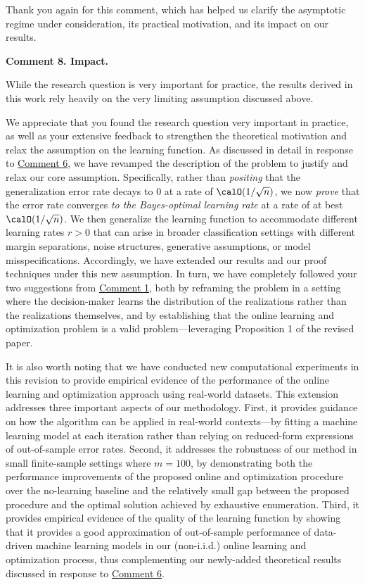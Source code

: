 \documentclass[11pt]{article}
\begin{document}
Thank you again for this comment, which has helped us clarify the asymptotic regime under consideration, its practical motivation, and its impact on our results.

\begin{commentBox}
\textbf{Comment 8. Impact.}\label{R1:8}

    While the research question is very important for practice, the results derived in this work rely heavily on the very limiting assumption discussed above.
\end{commentBox}

We appreciate that you found the research question very important in practice, as well as your extensive feedback to strengthen the theoretical motivation and relax the assumption on the learning function. As discussed in detail in response to \hyperref[R1:6]{\color{blue}Comment 6}, we have revamped the description of the problem to justify and relax our core assumption. Specifically, rather than \textit{positing} that the generalization error rate decays to 0 at a rate of $\calO(1/\sqrt{n})$, we now \textit{prove} that the error rate converges \textit{to the Bayes-optimal learning rate} at a rate of at best $\calO(1/\sqrt{n})$. We then generalize the learning function to accommodate different learning rates $r>0$ that can arise in broader classification settings with different margin separations, noise structures, generative assumptions, or model misspecifications. Accordingly, we have extended our results and our proof techniques under this new assumption. In turn, we have completely followed your two suggestions from \hyperref[R1:1]{\color{blue}Comment 1}, both by reframing the problem in a setting where the decision-maker learns the distribution of the realizations rather than the realizations themselves, and by establishing that the online learning and optimization problem is a valid problem---leveraging Proposition 1 of the revised paper.

It is also worth noting that we have conducted new computational experiments in this revision to provide empirical evidence of the performance of the online learning and optimization approach using real-world datasets. This extension addresses three important aspects of our methodology. First, it provides guidance on how the algorithm can be applied in real-world contexts---by fitting a machine learning model at each iteration rather than relying on reduced-form expressions of out-of-sample error rates. Second, it addresses the robustness of our method in small finite-sample settings where $m=100$, by demonstrating both the performance improvements of the proposed online and optimization procedure over the no-learning baseline and the relatively small gap between the proposed procedure and the optimal solution achieved by exhaustive enumeration. Third, it provides empirical evidence of the quality of the learning function by showing that it provides a good approximation of out-of-sample performance of data-driven machine learning models in our (non-i.i.d.) online learning and optimization process, thus complementing our newly-added theoretical results discussed in response to \hyperref[R1:6]{\color{blue}Comment 6}.
\end{document}
